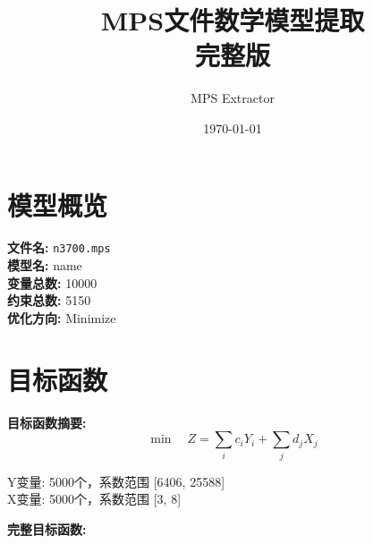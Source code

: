 \documentclass[a4paper,10pt]{article}
\title{MPS文件数学模型提取\\{\large 完整版}}
\author{MPS Extractor}
\date{\today}
\begin{document}
\maketitle
\tableofcontents
\newpage

\section{模型概览}

\textbf{文件名:} \texttt{n3700.mps} \\
\textbf{模型名:} name \\
\textbf{变量总数:} 10000 \\
\textbf{约束总数:} 5150 \\
\textbf{优化方向:} Minimize \\

\section{目标函数}

\textbf{目标函数摘要:}
\begin{equation}
\min \quad Z = \sum_{i} c_i Y_i + \sum_{j} d_j X_j
\end{equation}

Y变量: 5000个，系数范围 [6406, 25588] \\
X变量: 5000个，系数范围 [3, 8]

\textbf{完整目标函数:}
\end{document}
